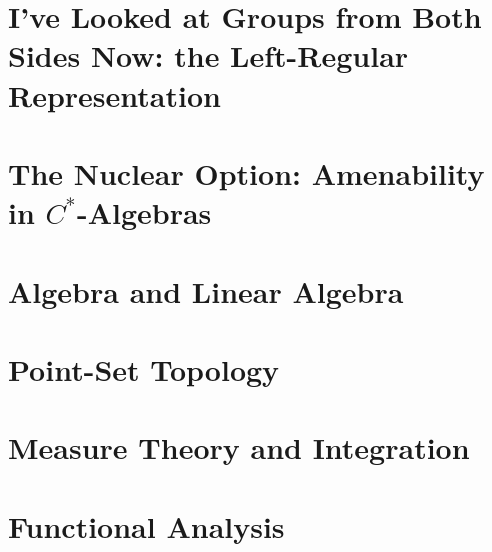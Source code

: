 \documentclass[10pt]{package2}
\begin{document}
\chapter{I've Looked at Groups from Both Sides Now: the Left-Regular Representation}\label{ch:left_regular_representation}

\chapter{The Nuclear Option: Amenability in \texorpdfstring{$C^{\ast}$-Algebras}{C*-Algebras}}\label{ch:nuclearity}
\appendix
\chapter{Algebra and Linear Algebra}\label{ch:algebra_and_linear_algebra}

\chapter{Point-Set Topology}\label{ch:point_set_topology}

\chapter{Measure Theory and Integration}\label{ch:measure_theory}

\chapter{Functional Analysis}\label{ch:functional_analysis}

\nocite{*}
\printbibliography[heading=bibintoc,title={References}]
\end{document}
